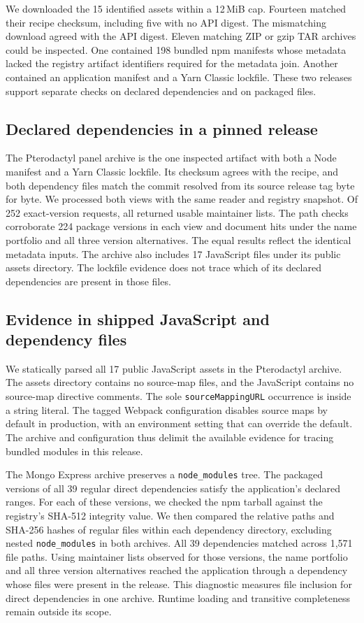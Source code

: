 We downloaded the 15 identified assets within a 12\,MiB cap. Fourteen matched their recipe checksum, including five with no API digest. The mismatching download agreed with the API digest. Eleven matching ZIP or gzip TAR archives could be inspected. One contained 198 bundled npm manifests whose metadata lacked the registry artifact identifiers required for the metadata join. Another contained an application manifest and a Yarn Classic lockfile. These two releases support separate checks on declared dependencies and on packaged files.

\subsection{Declared dependencies in a pinned release}
The Pterodactyl panel archive is the one inspected artifact with both a Node manifest and a Yarn Classic lockfile. Its checksum agrees with the recipe, and both dependency files match the commit resolved from its source release tag byte for byte. We processed both views with the same reader and registry snapshot. Of 252 exact-version requests, all returned usable maintainer lists. The path checks corroborate 224 package versions in each view and document hits under the name portfolio and all three version alternatives. The equal results reflect the identical metadata inputs. The archive also includes 17 JavaScript files under its public assets directory. The lockfile evidence does not trace which of its declared dependencies are present in those files.

\subsection{Evidence in shipped JavaScript and dependency files}
We statically parsed all 17 public JavaScript assets in the Pterodactyl archive. The assets directory contains no source-map files, and the JavaScript contains no source-map directive comments. The sole \texttt{sourceMappingURL} occurrence is inside a string literal. The tagged Webpack configuration disables source maps by default in production, with an environment setting that can override the default. The archive and configuration thus delimit the available evidence for tracing bundled modules in this release.

The Mongo Express archive preserves a \texttt{node\_modules} tree. The packaged versions of all 39 regular direct dependencies satisfy the application's declared ranges. For each of these versions, we checked the npm tarball against the registry's SHA-512 integrity value. We then compared the relative paths and SHA-256 hashes of regular files within each dependency directory, excluding nested \texttt{node\_modules} in both archives. All 39 dependencies matched across 1,571 file paths. Using maintainer lists observed for those versions, the name portfolio and all three version alternatives reached the application through a dependency whose files were present in the release. This diagnostic measures file inclusion for direct dependencies in one archive. Runtime loading and transitive completeness remain outside its scope.
